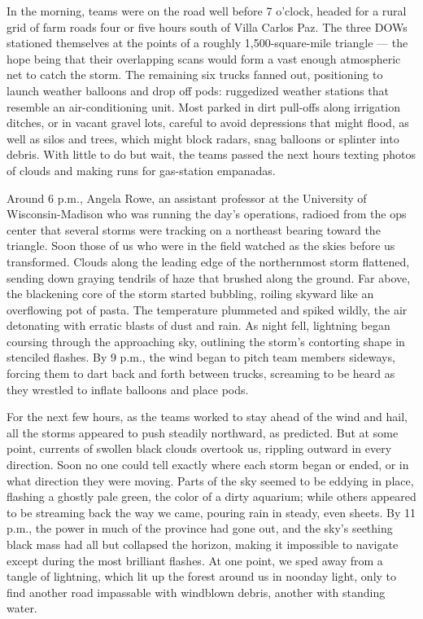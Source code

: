 In the morning, teams were on the road well before 7 o'clock, headed for
a rural grid of farm roads four or five hours south of Villa Carlos Paz.
The three DOWs stationed themselves at the points of a roughly
1,500-square-mile triangle --- the hope being that their overlapping
scans would form a vast enough atmospheric net to catch the storm. The
remaining six trucks fanned out, positioning to launch weather balloons
and drop off pods: ruggedized weather stations that resemble an
air-conditioning unit. Most parked in dirt pull-offs along irrigation
ditches, or in vacant gravel lots, careful to avoid depressions that
might flood, as well as silos and trees, which might block radars, snag
balloons or splinter into debris. With little to do but wait, the teams
passed the next hours texting photos of clouds and making runs for
gas-station empanadas.

Around 6 p.m., Angela Rowe, an assistant professor at the University of
Wisconsin-Madison who was running the day's operations, radioed from the
ops center that several storms were tracking on a northeast bearing
toward the triangle. Soon those of us who were in the field watched as
the skies before us transformed. Clouds along the leading edge of the
northernmost storm flattened, sending down graying tendrils of haze that
brushed along the ground. Far above, the blackening core of the storm
started bubbling, roiling skyward like an overflowing pot of pasta. The
temperature plummeted and spiked wildly, the air detonating with erratic
blasts of dust and rain. As night fell, lightning began coursing through
the approaching sky, outlining the storm's contorting shape in stenciled
flashes. By 9 p.m., the wind began to pitch team members sideways,
forcing them to dart back and forth between trucks, screaming to be
heard as they wrestled to inflate balloons and place pods.

For the next few hours, as the teams worked to stay ahead of the wind
and hail, all the storms appeared to push steadily northward, as
predicted. But at some point, currents of swollen black clouds overtook
us, rippling outward in every direction. Soon no one could tell exactly
where each storm began or ended, or in what direction they were moving.
Parts of the sky seemed to be eddying in place, flashing a ghostly pale
green, the color of a dirty aquarium; while others appeared to be
streaming back the way we came, pouring rain in steady, even sheets. By
11 p.m., the power in much of the province had gone out, and the sky's
seething black mass had all but collapsed the horizon, making it
impossible to navigate except during the most brilliant flashes. At one
point, we sped away from a tangle of lightning, which lit up the forest
around us in noonday light, only to find another road impassable with
windblown debris, another with standing water.

